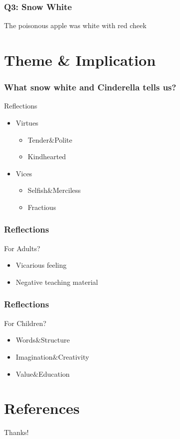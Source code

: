 \documentclass{beamer}
\begin{document}
\begin{frame}
    \frametitle{Q3: Snow White}
    \Huge{The poisonous apple was white with red cheek}
\end{frame}

\section{Theme \& Implication}
\begin{frame}
    \frametitle{What snow white and Cinderella tells us?}
    \begin{block}{Reflections}
        \begin{itemize}
            \item Virtues
                  \begin{itemize}
                      \item Tender$\&$Polite
                      \item Kindhearted
                  \end{itemize}
            \item Vices
                  \begin{itemize}
                      \item Selfish$\&$Merciless
                      \item Fractious
                  \end{itemize}
        \end{itemize}
    \end{block}
\end{frame}

\begin{frame}
    \frametitle{Reflections}
    \begin{block}{For Adults?}
        \begin{itemize}
            \item Vicarious feeling
            \item Negative teaching material
        \end{itemize}
    \end{block}
\end{frame}

\begin{frame}
    \frametitle{Reflections}
    \begin{block}{For Children?}
        \begin{itemize}
            \item Words$\&$Structure
            \item Imagination$\&$Creativity
            \item Value$\&$Education
        \end{itemize}
    \end{block}
\end{frame}

\section{References}

\begin{frame}[allowframebreaks]
    
    
\end{frame}

\begin{frame}
    \begin{center}
        {\Huge\calligra Thanks!}\cite{origin}
    \end{center}
\end{frame}
\end{document}
